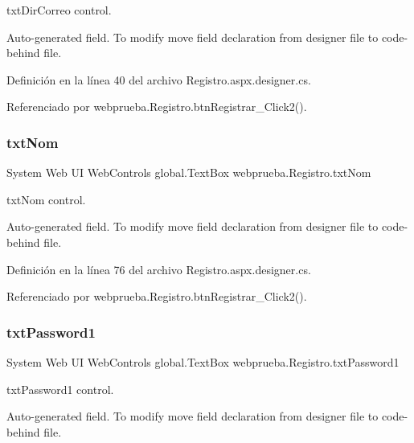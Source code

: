 txt\+Dir\+Correo control. 

Auto-\/generated field. To modify move field declaration from designer file to code-\/behind file. 

Definición en la línea 40 del archivo Registro.\+aspx.\+designer.\+cs.



Referenciado por webprueba.\+Registro.\+btn\+Registrar\+\_\+\+Click2().

\mbox{\label{classwebprueba_1_1_registro_a52e32e3d9dfd1515986fc7a41cab8052}} 
\subsubsection{\texorpdfstring{txtNom}{txtNom}}
{\footnotesize\ttfamily System Web UI Web\+Controls global.\+Text\+Box webprueba.\+Registro.\+txt\+Nom\hspace{0.3cm}{\ttfamily [protected]}}



txt\+Nom control. 

Auto-\/generated field. To modify move field declaration from designer file to code-\/behind file. 

Definición en la línea 76 del archivo Registro.\+aspx.\+designer.\+cs.



Referenciado por webprueba.\+Registro.\+btn\+Registrar\+\_\+\+Click2().

\mbox{\label{classwebprueba_1_1_registro_abec622e5e6791f3d28c8d4bae7cc606b}} 
\subsubsection{\texorpdfstring{txtPassword1}{txtPassword1}}
{\footnotesize\ttfamily System Web UI Web\+Controls global.\+Text\+Box webprueba.\+Registro.\+txt\+Password1\hspace{0.3cm}{\ttfamily [protected]}}



txt\+Password1 control. 

Auto-\/generated field. To modify move field declaration from designer file to code-\/behind file. 

